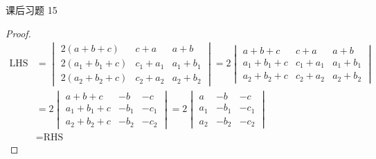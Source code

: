 \begin{problem}
	课后习题 15
	\begin{proof}
		$$
		\begin{aligned}
			\text{LHS} & = \begin{vmatrix}
				2(a + b + c) & c + a & a + b \\
				2(a_1 + b_1 + c) & c_1 + a_1 & a_1 + b_1 \\
				2(a_2 + b_2 + c) & c_2 + a_2 & a_2 + b_2
			\end{vmatrix} = 2\begin{vmatrix}
				a + b + c & c + a & a + b \\
				a_1 + b_1 + c & c_1 + a_1 & a_1 + b_1 \\
				a_2 + b_2 + c & c_2 + a_2 & a_2 + b_2
			\end{vmatrix} \\
			& = 2\begin{vmatrix}
				a + b + c & -b & -c \\
				a_1 + b_1 + c & -b_1 & -c_1 \\
				a_2 + b_2 + c & -b_2 & -c_2
			\end{vmatrix} = 2\begin{vmatrix}
				a & -b & -c \\
				a_1 & -b_1 & -c_1 \\
				a_2 & -b_2 & -c_2
			\end{vmatrix} \\
			& = \text{RHS}
		\end{aligned}
		$$
	\end{proof}
\end{problem}

